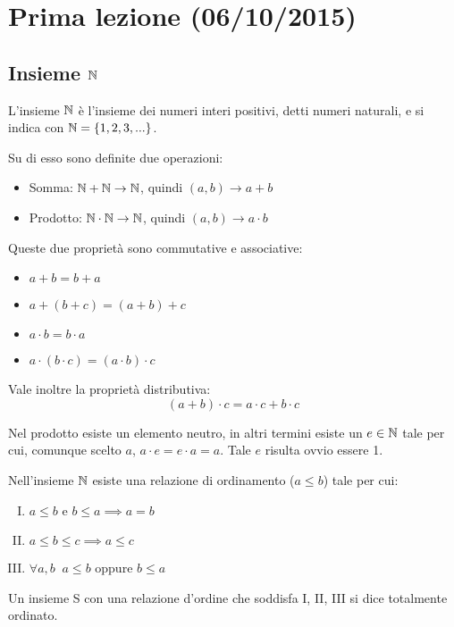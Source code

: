 \chapter{Prima lezione (06/10/2015)}

\section{Insieme $\mathbb N$}

\begin{definition}
L'insieme $\mathbb N$ è l'insieme dei numeri interi positivi, detti numeri naturali, e si indica con $\mathbb N=\{1,2,3,...\}$.
\end{definition}

Su di esso sono definite due operazioni:
\begin{itemize}
\item Somma: $\mathbb N + \mathbb N \to \mathbb N$, quindi $(a, b) \to a + b$
\item Prodotto: $\mathbb N \cdot \mathbb N \to \mathbb N$, quindi $(a, b) \to a\cdot b$
\end{itemize}

Queste due proprietà sono commutative e associative:
\begin{itemize}
\item $a+b=b+a$
\item $a+(b+c)=(a+b)+c$
\item $a\cdot b = b\cdot a$
\item $a\cdot(b\cdot c) = (a\cdot b)\cdot c$
\end{itemize}

Vale inoltre la proprietà distributiva:
\begin{equation*}
(a+b)\cdot c = a\cdot c + b\cdot c
\end{equation*}

Nel prodotto esiste un elemento neutro, in altri termini esiste un $e \in \mathbb N$ tale per cui, comunque scelto $a$, $a \cdot e = e \cdot a = a$. Tale $e$ risulta ovvio essere 1.

Nell'insieme $\mathbb N$ esiste una relazione di ordinamento ($a \le b$) tale per cui:
\begin{enumerate}[I.]
\item $a \le b$ e $b \le a \implies a = b$
\item $a \le b \le c \implies a \le c$
\item $\forall a,b \;\; a \le b$ oppure $b \le a$
\end{enumerate}


\begin{definition}
Un insieme S con una relazione d'ordine che soddisfa I, II, III si dice totalmente ordinato.
\end{definition}

